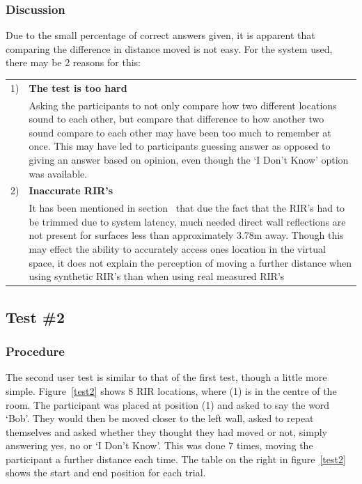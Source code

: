 \documentclass[../../main.tex]{subfiles}
\begin{document}
		\subsubsection{Discussion}


			Due to the small percentage of correct answers given, it is apparent that comparing the difference in distance moved is not easy. For the system used, there may be 2 reasons for this:

			\begin{tabular}{l p{} }
			1) & \textbf{The test is too hard} \\
			& Asking the participants to not only compare how two different locations sound to each other, but compare that difference to how another two sound compare to each other may have been too much to remember at once. This may have led to participants guessing answer as opposed to giving an answer based on opinion, even though the `I Don't Know' option was available. \\
			2) & \textbf{Inaccurate \ac{RIR}'s} \\
			& It has been mentioned in section~\fullref{RIRtrimming} that due the fact that the \ac{RIR}'s had to be trimmed due to system latency, much needed direct wall reflections are not present for surfaces less than approximately 3.78m away. Though this may effect the ability to accurately access ones location in the virtual space, it does not explain the perception of moving a further distance when using synthetic \ac{RIR}'s than when using real measured \ac{RIR}'s\\
			\end{tabular}

		\subsection{Test \#2}

			\subsubsection{Procedure}
				The second user test is similar to that of the first test, though a little more simple. Figure~\ref{test2} shows 8 \ac{RIR} locations, where (1) is in the centre of the room. The participant was placed at position (1) and asked to say the word `Bob'. They would then be moved closer to the left wall, asked to repeat themselves and asked whether they thought they had moved or not, simply answering yes, no or `I Don't Know'. This was done 7 times, moving the participant a further distance each time. The table on the right in figure~\ref{test2} shows the start and end position for each trial.
\end{document}
